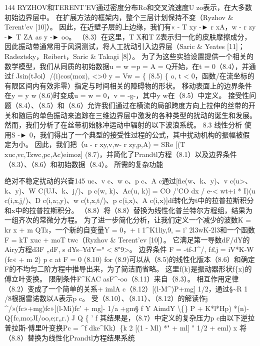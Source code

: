 \documentclass[UTF8,11pt,a4paper,openany,fontset=fandol]{ctexbook}
\begin{document}
144 RYZHOV和TERENT'EV通过密度分布Ro和交叉流速度U zo表示，在大多数初始边界层中。 在扩展方法的框架内，整个三层计划保持不变（Ryzhov \& Terent'ev [10]）。 因此，在近壁子层的上边缘，我们有« - T xy -► r xA，w - r zy -► T ZA as y -► oo。 （8.3）在这里，T X和T Z表示归一化的皮肤摩擦成分，因此振动带通常用于风洞测试，将人工扰动引入边界层（Saric \& Yeates [11]；Radeztsky，Reibert，Saric \& Takagi [8]）。 为了为这些实验设置提供一个相关的数学模型，我们从同质的初始数据u = w =p = A = Q开始，在t = 0（8.4），并通过f Jsin(tJoi）/(i)cos(moz), <>0 y = Vw = \{ (8.5) \{ o, t < 0，函数/在流坐标的有限区间内有效非零）指定与时间相关的障碍物的形状。 移动表面上的边界条件在y = y w (8.6)时变成u = w = 0，v = -g-，其中y w在（8.5）中定义。 接受性问题（8.4）、（8.5）和（8.6）允许我们通过在横流的局部跨度方向上拉伸的丝带的开关和随后的单色振动来追踪在三维边界层中激发的各种类型的扰动的诞生和发展。 然而，我们分析了在丝带初始脉冲运动中辐射的以下波浪系统。 8.3 线性分析 使用S -► 0，我们得出了一个典型的接受性过程的公式，其中扰动机构的振幅被假定为小。 因此，我们把（u - r xy,v,w- r zy,p,A) = SRe [(T xuc,vc,Tzwc,pc,Ac)eimoz] (8.7)，并简化了Prandtl方程（8.1）以及边界条件（8.3）、（8.6）和初始数据（8.4）。 所需的复杂功能

绝对不稳定扰动的兴奋145 uc、v c、w c、p c、A c通过[fie(w、k、y)、v c(u>、k、y)、W C(UJ、k、j/)、p c(w, k)、Ac(u, k)] = CO /'CO dx / e-< wt+i * I)(u c(i,x,j/)、D c(i,a;,y)、w c(t,x,t/)、p c(i,x)、A c(i,x)]df转化为t中的拉普拉斯积分和x中的拉普拉斯积分。 （8.8）将（8.8）替换为线性化普兰特尔方程组，结果为一组齐次的常微分方程。 为了进一步简化分析，让我们定义一个减少的波数K = kr x + m QTz，一个新的自变量Y = 0，+ i 1\textasciicircum{}K1liy,9, = i' 2l3wK-2l3和一个函数F = kT xuc + moT twc（Ryzhov \& Terent'ev [10]）。 它满足第一导数dF/dY的Airy方程d3F „dF, s dYs--YdY=° < 8"9>。 边界条件 F = -tf-J\textasciicircum{}/, f£j = iV*K-W (fc« + m 2) p c at F = 0 (8.10) for (8.9)可以从（8.5)的线性化版本（8.6）和确定F的不均匀二阶方程中推导出来，为了简洁而省略。 这里f(k)是振动器形状f\{x)的傅立叶变换。 限制条件F\textasciicircum{}KAC asF\textasciicircum{}-oo（8.11）来自（8.3）。 相互作用定律（8.2）变成了一个简单的关系+ imlA c（8.12）[(l-M\textasciicircum{})P+mg] 1/2，通过§\textasciitilde{}R 1 /8根据雷诺数以A表示p c。 受（8.10）、（8.11）、（8.12）的解读作j \textasciicircum{}/»(fc»+mg)fc»[(l-Mi)fc' + mg]- 1/a +gm§ f Y AimdY \textbackslash\{\} P + K*l*Hp) *(n)-Q\{fc,mo;JI/oo,e;r„r.) J Q \{ ' f 其结果是，（8.7）中定义的复杂压力p c由以下逆拉普拉斯-傅里叶变换Pc = \textasciicircum{}f dke\textasciicircum{}Kk）\{k 2 [(1 - Ml) *" + ml] " 1/2 + eml) x 将（8.8）替换为线性化Prandtl方程结果系统
\end{document}
